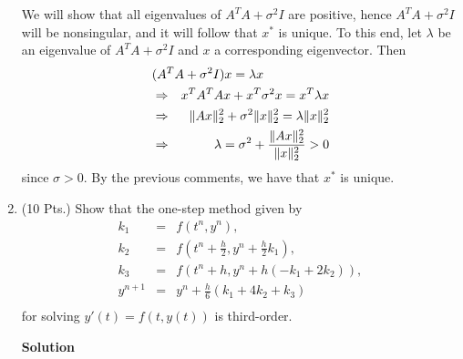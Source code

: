 \documentclass{article}
\begin{document}
\begin{enumerate}
We will show that all eigenvalues of \(A^T A + \sigma^2 I\) are positive, hence \(A^T A + \sigma^2 I\) will be nonsingular, and it will follow that \(x^*\) is unique.  To this end, let \(\lambda\) be an eigenvalue of \(A^T A + \sigma^2 I\) and \(x\) a corresponding eigenvector.  Then
\begin{eqnarray*}
\lefteqn{(A^T A + \sigma^2 I) x = \lambda x} \\
& \Rightarrow & x^T A^T A x + x^T \sigma^2 x = x^T \lambda x \\
& \Rightarrow & \|Ax\|_2^2 + \sigma^2 \|x\|_2^2 = \lambda \|x\|_2^2 \\
& \Rightarrow & \lambda = \sigma^2 + \frac{\|Ax\|_2^2}{\|x\|_2^2} > 0
\end{eqnarray*}
since \(\sigma > 0\).  By the previous comments, we have that \(x^*\) is unique.



\item (10 Pts.) Show that the one-step method given by
\begin{eqnarray*}
k_1 & = & f(t^n,y^n), \\
k_2 & = & f \left( t^n + \frac{h}{2}, y^n + \frac{h}{2} k_1 \right), \\
k_3 & = & f \left( t^n + h, y^n + h (-k_1 + 2k_2) \right), \\
y^{n + 1} & = & y^n + \frac{h}{6} \left( k_1 + 4k_2 + k_3 \right) \\
\end{eqnarray*}
for solving \(y'(t) = f(t,y(t))\) is third-order.

{\bf Solution}


\end{enumerate}
\end{document}
